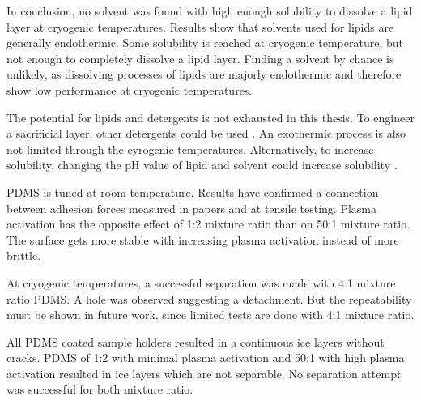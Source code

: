 In conclusion, no solvent was found with high enough solubility to dissolve a lipid layer at cryogenic temperatures. Results show that solvents used for lipids are generally endothermic. Some solubility is reached at cryogenic temperature, but not enough to completely dissolve a lipid layer. Finding a solvent by chance is unlikely, as dissolving processes of lipids are majorly endothermic and therefore show low performance at cryogenic temperatures. 

The potential for lipids and detergents is not exhausted in this thesis. To engineer a sacrificial layer, other detergents could be used \cite{SigmaAldrich.2023}. An exothermic process is also not limited through the cyrogenic temperatures. Alternatively, to increase solubility, changing the pH value of lipid and solvent could increase solubility \cite{BruceA.AverillPatriciaEldredge.}.

PDMS is tuned at room temperature. Results have confirmed a connection between adhesion forces measured in papers and at tensile testing. Plasma activation has the opposite effect of 1:2 mixture ratio than on 50:1 mixture ratio. The surface gets more stable with increasing plasma activation instead of more brittle.


At cryogenic temperatures, a successful separation was made with 4:1 mixture ratio PDMS. A hole was observed suggesting a detachment. But the repeatability must be shown in future work, since limited tests are done with 4:1 mixture ratio.

All PDMS coated sample holders resulted in a continuous ice layers without cracks. PDMS of 1:2 with minimal plasma activation and 50:1 with high plasma activation resulted in ice layers which are not separable. No separation attempt was successful for both mixture ratio.


